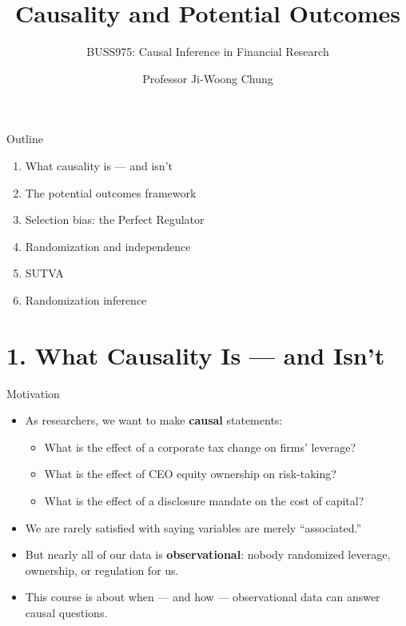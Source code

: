 \documentclass[
  11pt,
  ignorenonframetext,
  aspectratio=169,
]{beamer}
\title{\texorpdfstring{Causality and Potential
Outcomes}{Causality and Potential Outcomes}}
\subtitle{\texorpdfstring{BUSS975: Causal Inference in Financial
Research}{BUSS975: Causal Inference in Financial Research}}
\author{Professor Ji-Woong Chung}
\date{}
\institute{Korea University}
\providecommand{\tightlist}{%
  \setlength{\itemsep}{0pt}\setlength{\parskip}{0pt}}
\begin{document}
\frame{\titlepage}


\begin{frame}{Outline}
\protect{}\label{outline}
\begin{enumerate}
\tightlist
\item
  What causality is --- and isn't
\item
  The potential outcomes framework
\item
  Selection bias: the Perfect Regulator
\item
  Randomization and independence
\item
  SUTVA
\item
  Randomization inference
\end{enumerate}
\end{frame}

\section{1. What Causality Is --- and
Isn't}\label{what-causality-is-and-isnt}

\begin{frame}{Motivation}
\protect{}\label{motivation}
\begin{itemize}
\tightlist
\item
  As researchers, we want to make \textbf{causal} statements:

  \begin{itemize}
  \tightlist
  \item
    What is the effect of a corporate tax change on firms' leverage?
  \item
    What is the effect of CEO equity ownership on risk-taking?
  \item
    What is the effect of a disclosure mandate on the cost of capital?
  \end{itemize}
\item
  We are rarely satisfied with saying variables are merely
  ``associated.''
\item
  But nearly all of our data is \textbf{observational}: nobody
  randomized leverage, ownership, or regulation for us.
\item
  This course is about when --- and how --- observational data can
  answer causal questions.
\end{itemize}
\end{frame}
\end{document}
